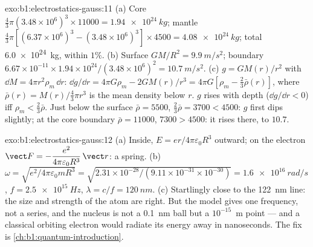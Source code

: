 \begin{solution}{exo:b1:electrostatics-gauss:11}
(a) Core $\tfrac43\pi(3.48 \times 10^6)^3 \times 11000 = \qty{1.94e24}{kg}$; mantle
$\tfrac43\pi[(6.37 \times 10^6)^3 - (3.48 \times 10^6)^3] \times 4500 = \qty{4.08e24}{kg}$;
total \qty{6.0e24}{kg}, within $1\%$. (b) Surface $GM/R^2 = \qty{9.9}{m/s^2}$;
boundary $6.67 \times 10^{-11} \times 1.94 \times 10^{24}/(3.48 \times 10^6)^2 =
\qty{10.7}{m/s^2}$. (c) $g = GM(r)/r^2$ with $\dd M = 4\pi r^2\rho_m\,\dd r$:
$\dd g/\dd r = 4\pi G\rho_m - 2GM(r)/r^3 = 4\pi G[\rho_m - \tfrac23\bar\rho(r)]$,
where $\bar\rho(r) = M(r)/\tfrac43\pi r^3$ is the mean density below $r$.
$g$ rises with depth ($\dd g/\dd r < 0$) iff $\rho_m < \tfrac23\bar\rho$. Just
below the surface $\bar\rho = 5500$, $\tfrac23\bar\rho = 3700 < 4500$: $g$
first dips slightly; at the core boundary $\bar\rho = 11000$, $7300 >
4500$: it rises there, to $10.7$.
\end{solution}

\begin{solution}{exo:b1:electrostatics-gauss:12}
(a) Inside, $E = er/4\pi\varepsilon_0R^3$ outward; on the electron $\vect F =
-\dfrac{e^2}{4\pi\varepsilon_0R^3}\,\vect r$: a spring. (b) $\omega = \sqrt{e^2/4\pi\varepsilon_0mR^3}
= \sqrt{2.31 \times 10^{-28}/(9.11 \times 10^{-31} \times 10^{-30})} = \qty{1.6e16}{rad/s}$,
$f = \qty{2.5e15}{Hz}$, $\lambda = c/f = \qty{120}{nm}$. (c) Startlingly close
to the \qty{122}{nm} line: the size and strength of the atom are right.
But the model gives one frequency, not a series, and the nucleus is
not a \qty{0.1}{nm} ball but a $10^{-15}$~m point --- and a classical
orbiting electron would radiate its energy away in nanoseconds. The
fix is \cref{ch:b1:quantum-introduction}.
\end{solution}

